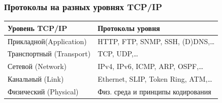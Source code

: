 \begin{frame}
    \frametitle{Протоколы на разных уровнях TCP/IP}
        
    \begin{table}
        \centering
        \begin{tabular}{|l|l|}
            \hline\hline
            Уровень TCP/IP              & Протоколы уровня\\
            \hline\hline
            Прикладной(Application)     & HTTP, FTP, SNMP, SSH, (D)DNS,\ldots \\ \hline
            Транспортный (Transport)    & TCP, UDP,\ldots \\ \hline
            Сетевой (Network)           & IPv4, IPv6, ICMP, ARP, OSPF,\ldots \\ \hline
            Канальный (Link)            & Ethernet, SLIP, Token Ring, ATM,\ldots \\ \hline
            Физический (Physical)       & Физ. среда и принципы кодирования\\ \hline
        \end{tabular}
    \end{table}
\end{frame}


